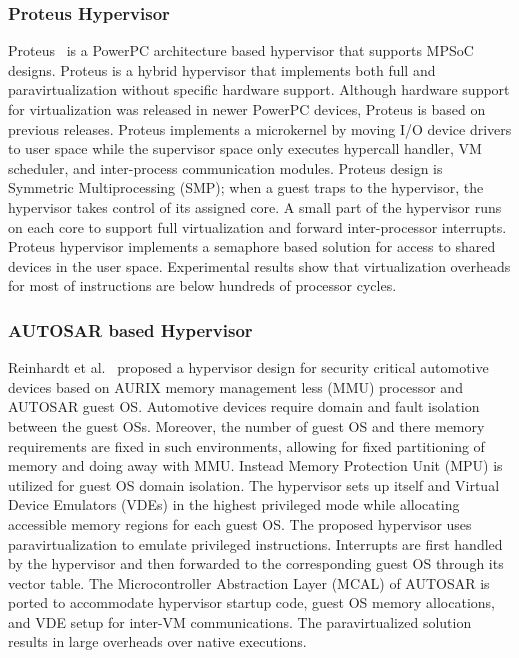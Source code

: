 \documentclass[journal, 10pt]{IEEEtran}
\begin{document}
\subsubsection{Proteus Hypervisor}\label{sec:prot} 
Proteus~\cite{Gilles2013} is a PowerPC architecture based hypervisor that supports MPSoC designs. Proteus is a hybrid hypervisor that implements both full and paravirtualization without specific hardware support. Although hardware support for virtualization was released in newer PowerPC devices, Proteus is based on previous releases. Proteus implements a microkernel by moving I/O device drivers to user space while the supervisor space only executes hypercall handler, VM scheduler, and inter-process communication modules.  Proteus design is Symmetric Multiprocessing (SMP); when a guest traps to the hypervisor, the hypervisor takes control of its assigned core. A small part of the hypervisor runs on each core to support full virtualization and forward inter-processor interrupts. Proteus hypervisor implements a semaphore based solution for access to shared devices in the user space. Experimental results show that virtualization overheads for most of instructions are below hundreds of processor cycles.    
 
\subsubsection{AUTOSAR based Hypervisor}\label{sec:auto} 
Reinhardt et al.~\cite{Reinhardt2014} proposed a hypervisor design for security critical automotive devices based on AURIX memory management less (MMU) processor and AUTOSAR guest OS. Automotive devices require domain and fault isolation between the guest OSs. Moreover, the number of guest OS and there memory requirements are fixed in such environments, allowing for fixed partitioning of memory and doing away with MMU. Instead Memory Protection Unit (MPU) is utilized for guest OS domain isolation. The hypervisor sets up itself and Virtual Device Emulators (VDEs) in the highest privileged mode while allocating accessible memory regions for each guest OS. The proposed hypervisor uses paravirtualization to emulate privileged instructions. Interrupts are first handled by the hypervisor and then forwarded to the corresponding guest OS through its vector table. The Microcontroller Abstraction Layer (MCAL) of AUTOSAR is ported to accommodate hypervisor startup code, guest OS memory allocations, and VDE setup for inter-VM communications. The paravirtualized solution results in large overheads over native executions.
\end{document}
